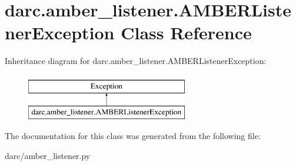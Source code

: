 \hypertarget{classdarc_1_1amber__listener_1_1_a_m_b_e_r_listener_exception}{}\section{darc.\+amber\+\_\+listener.\+A\+M\+B\+E\+R\+Listener\+Exception Class Reference}
\label{classdarc_1_1amber__listener_1_1_a_m_b_e_r_listener_exception}
Inheritance diagram for darc.\+amber\+\_\+listener.\+A\+M\+B\+E\+R\+Listener\+Exception\+:\begin{figure}[H]
\begin{center}
\leavevmode
\includegraphics[height=2.000000cm]{classdarc_1_1amber__listener_1_1_a_m_b_e_r_listener_exception}
\end{center}
\end{figure}


The documentation for this class was generated from the following file\+:\begin{DoxyCompactItemize}
\item 
darc/amber\+\_\+listener.\+py\end{DoxyCompactItemize}
